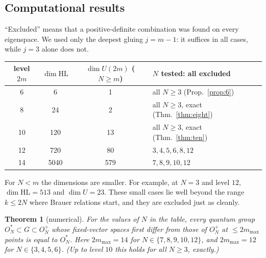 \documentclass[11pt]{amsart}
\newtheorem{theorem}{Theorem}[section]
\theoremstyle{definition}
\theoremstyle{remark}
\theoremstyle{plain}
\numberwithin{equation}{section}
\numberwithin{table}{section}
\newcommand{\HL}{\mathrm{HL}}
\begin{document}
\subsection{Computational results}

``Excluded'' means that a positive-definite
combination was found on every eigenspace. We used only the deepest gluing $j=m-1$: it suffices in all cases,
while $j=3$ alone does not.

\begin{center}
\begin{tabular}{@{}cccl@{}}
\toprule
level $2m$ & $\dim\HL$ & $\dim U(2m)$ ($N\ge m$) & $N$ tested: all excluded \\
\midrule
6 & 6 & 1 & all $N\ge3$ (Prop.~\ref{prop:6}) \\
8 & 24 & 2 & all $N\ge3$, exact (Thm.~\ref{thm:eight}) \\
10 & 120 & 13 & all $N\ge3$, exact (Thm.~\ref{thm:ten}) \\
12 & 720 & 80 & $3,4,5,6,8,12$ \\
14 & 5040 & 579 & $7,8,9,10,12$ \\
\bottomrule
\end{tabular}
\end{center}

For $N<m$ the dimensions are smaller. For example, at $N=3$ and level $12$, $\dim\HL=513$ and $\dim U=23$. These small
cases lie well beyond the range $k\le 2N$ where Brauer relations start, and they are excluded just as cleanly.

\begin{theorem}[numerical]
For the values of $N$ in the table, every quantum group $O_N^*\subset G\subset O_N^+$ whose fixed-vector
spaces first differ from those of $O_N^+$ at $\le 2m_{\max}$ points is equal to $O_N^*$. Here $2m_{\max}=14$ for
$N\in\{7,8,9,10,12\}$, and $2m_{\max}=12$ for $N\in\{3,4,5,6\}$. (Up to level $10$ this holds for all $N\ge3$, exactly.)
\end{theorem}
\end{document}
